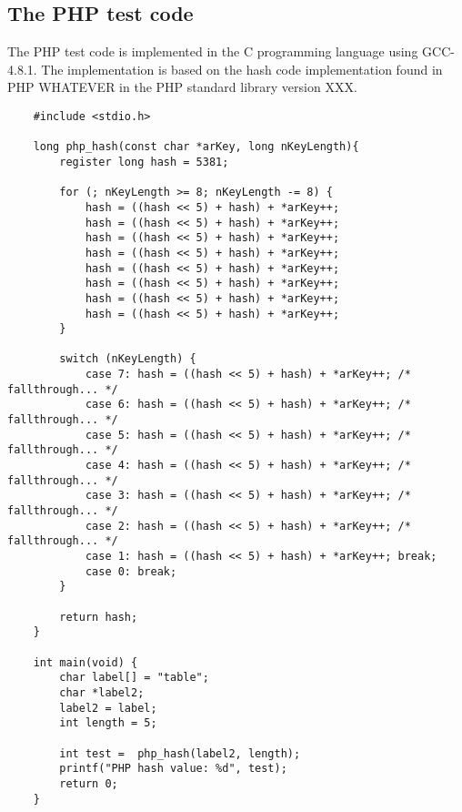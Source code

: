 \documentclass[titlepage]{article}
\begin{document}
\begin{appendices}
\begin{lstlisting}
	\end{lstlisting}


\subsection{The PHP test code}
The PHP test code is implemented in the C programming language using GCC-4.8.1. The implementation is based on the hash code implementation found in PHP WHATEVER in the PHP standard library version XXX.

	\lstset{language=c}
	\begin{lstlisting}
	#include <stdio.h>
	
	long php_hash(const char *arKey, long nKeyLength){
		register long hash = 5381;
		
		for (; nKeyLength >= 8; nKeyLength -= 8) {
			hash = ((hash << 5) + hash) + *arKey++;
			hash = ((hash << 5) + hash) + *arKey++;
			hash = ((hash << 5) + hash) + *arKey++;
			hash = ((hash << 5) + hash) + *arKey++;
			hash = ((hash << 5) + hash) + *arKey++;
			hash = ((hash << 5) + hash) + *arKey++;
			hash = ((hash << 5) + hash) + *arKey++;
			hash = ((hash << 5) + hash) + *arKey++;
		}
		
		switch (nKeyLength) {
			case 7: hash = ((hash << 5) + hash) + *arKey++; /* fallthrough... */
			case 6: hash = ((hash << 5) + hash) + *arKey++; /* fallthrough... */
			case 5: hash = ((hash << 5) + hash) + *arKey++; /* fallthrough... */
			case 4: hash = ((hash << 5) + hash) + *arKey++; /* fallthrough... */
			case 3: hash = ((hash << 5) + hash) + *arKey++; /* fallthrough... */
			case 2: hash = ((hash << 5) + hash) + *arKey++; /* fallthrough... */
			case 1: hash = ((hash << 5) + hash) + *arKey++; break;
			case 0: break;
		}
		
		return hash;
	}
	
	int main(void) {
		char label[] = "table";
		char *label2;
		label2 = label;
		int length = 5;
		
		int test =  php_hash(label2, length);
		printf("PHP hash value: %d", test);
		return 0;
	}
	
	\end{lstlisting}


\end{appendices}
\end{document}
